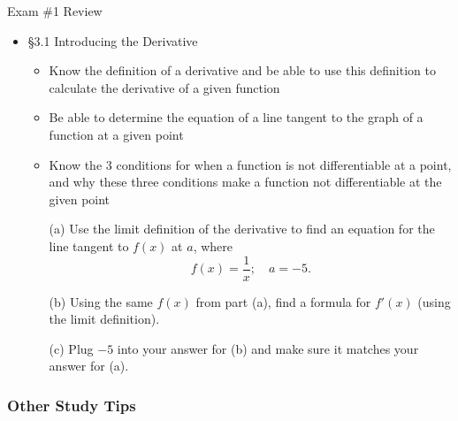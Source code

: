 \documentclass[cal1spr16Lectures.tex]{subfiles}
\begin{document}
\begin{frame}[allowframebreaks]{Exam \#1 Review}
\begin{itemize}
\begin{ex}
\begin{columns}[T]
\begin{column}{.55\textwidth}
\begin{itemize}
	\hspace{6pc}$0<|x-2|<\delta$
	\end{itemize}
	\end{column}
\end{columns}
\end{ex}
In this example, the two-sided limits at $x=1$ and $x=2$ do not exist.
\framebreak
\item \S 3.1 Introducing the Derivative
	\begin{itemize}\footnotesize
	\item Know the definition of a derivative and be able to use this definition to calculate the derivative of a given function
	\item Be able to determine the equation of a line tangent to the graph of a function at a given point
	\item Know the 3 conditions for when a function is not differentiable at a point, and why these three conditions make a function not differentiable at the given point
	\end{itemize}
\begin{ex}
	\begin{itemize}\footnotesize
	\item[(a)] Use the limit definition of the derivative to find an equation for the line tangent to $f(x)$ at $a$, where
	\[f(x)=\frac{1}{x};\quad a=-5.\]
	\item[(b)] Using the same $f(x)$ from part (a), find a formula for $f'(x)$ (using the limit definition).
	\item[(c)] Plug $-5$ into your answer for (b) and make sure it matches your answer for (a).
	\end{itemize}
\end{ex}
\end{itemize}
\end{frame}

\subsubsection{Other Study Tips}
\end{document}

